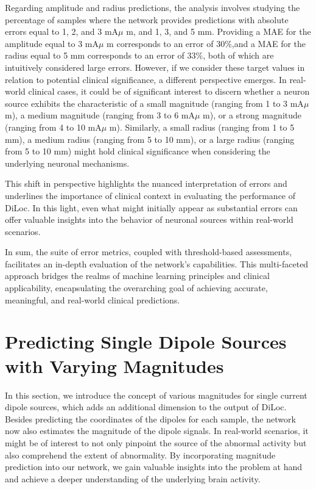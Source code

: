 \documentclass[a4paper, UKenglish, 11pt]{uiomaster}
\begin{document}
Regarding amplitude and radius predictions, the analysis involves studying the percentage of samples where the network provides predictions with absolute errors equal to 1, 2, and 3 mA$\mu$ m, and 1, 3, and 5 mm. Providing a MAE for the amplitude equal to 3 mA$\mu$ m corresponds to an error of 30$\%$,and a MAE for the radius equal to 5 mm corresponds to an error of 33$\%$, both of which are intuitively considered large errors. However, if we consider these target values in relation to potential clinical significance, a different perspective emerges. In real-world clinical cases, it could be of significant interest to discern whether a neuron source exhibits the characteristic of a small magnitude (ranging from 1 to 3 mA$\mu$ m), a medium magnitude (ranging from 3 to 6 mA$\mu$ m), or a strong magnitude (ranging from 4 to 10 mA$\mu$ m). Similarly, a small radius (ranging from 1 to 5 mm), a medium radius (ranging from 5 to 10 mm), or a large radius (ranging from 5 to 10 mm) might hold clinical significance when considering the underlying neuronal mechanisms.

This shift in perspective highlights the nuanced interpretation of errors and underlines the importance of clinical context in evaluating the performance of DiLoc. In this light, even what might initially appear as substantial errors can offer valuable insights into the behavior of neuronal sources within real-world scenarios.

In sum, the suite of error metrics, coupled with threshold-based assessments, facilitates an in-depth evaluation of the network's capabilities. This multi-faceted approach bridges the realms of machine learning principles and clinical applicability, encapsulating the overarching goal of achieving accurate, meaningful, and real-world clinical predictions.





\section{Predicting Single Dipole Sources with Varying Magnitudes}

In this section, we introduce the concept of various magnitudes for single current dipole sources, which adds an additional dimension to the output of DiLoc. Besides predicting the coordinates of the dipoles for each sample, the network now also estimates the magnitude of the dipole signals. In real-world scenarios, it might be of interest to not only pinpoint the source of the abnormal activity but also comprehend the extent of abnormality. By incorporating magnitude prediction into our network, we gain valuable insights into the problem at hand and achieve a deeper understanding of the underlying brain activity.
\end{document}
